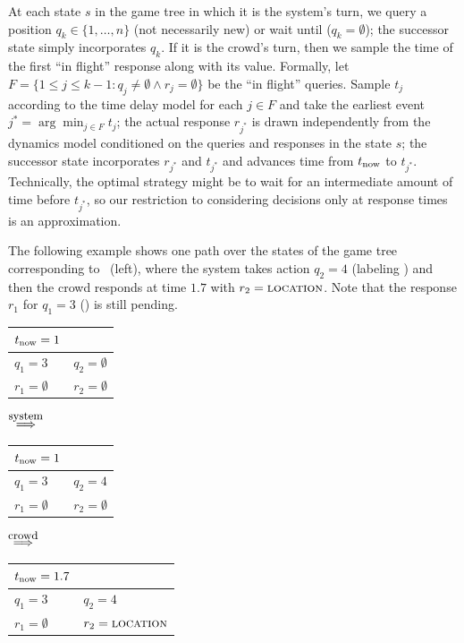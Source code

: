 At each state $s$ in the game tree in which it is the system's turn,
we query a position $q_k \in \{1, \dots, n\}$ (not necessarily new)
or wait until ($q_k = \emptyset$);
the successor state simply incorporates $q_k$.
If it is the crowd's turn,
then we sample the time of the first ``in flight'' response along with its value.
Formally, let $F = \{ 1 \le j \le k-1 : q_j \neq \emptyset \wedge r_j = \emptyset \}$ be the ``in flight'' queries.
Sample $t_j$ according to the time delay model for each $j \in F$
and take the earliest event $j^* = \arg\min_{j \in F} t_j$;
the actual response $r_{j^*}$ is drawn independently from the dynamics model conditioned on the queries and responses
in the state $s$;
the successor state incorporates $r_{j^*}$ and $t_{j^*}$ and advances time from $t_\text{now}$ to $t_{j^*}$.
Technically, the optimal strategy might be to wait for an intermediate amount of time before $t_{j^*}$,
so our restriction to considering decisions only at response times is an approximation.

The following example shows one path over the states of the game tree corresponding to ~(left),
where the system takes action $q_2 = 4$ (labeling ) and then the crowd responds
at time $1.7$ with $r_2 = \textsc{location}$.
Note that the response $r_1$ for $q_1 = 3$ () is still pending.
\begin{center}
\begin{tabular}{|ll|}
  \hline $t_\text{now} = 1$ & \\
  \hline
  $q_1 = 3$         & $q_2 = \emptyset$ \\
  $r_1 = \emptyset$ & $r_2 = \emptyset$ \\
  \hline
\end{tabular}
$\stackrel{\text{\small system}}{\implies}$
\begin{tabular}{|ll|}
  \hline $t_\text{now} = 1$ & \\
  \hline
  $q_1 = 3$         & $q_2 = 4$ \\
  $r_1 = \emptyset$ & $r_2 = \emptyset$ \\
  \hline
\end{tabular}
$\stackrel{\text{\small crowd}}{\implies}$
\begin{tabular}{|ll|}
  \hline $t_\text{now} = 1.7$ & \\
  \hline
  $q_1 = 3$         & $q_2 = 4$ \\
  $r_1 = \emptyset$ & $r_2 = \text{\textsc{location}}$ \\
  \hline
\end{tabular}
\end{center}

